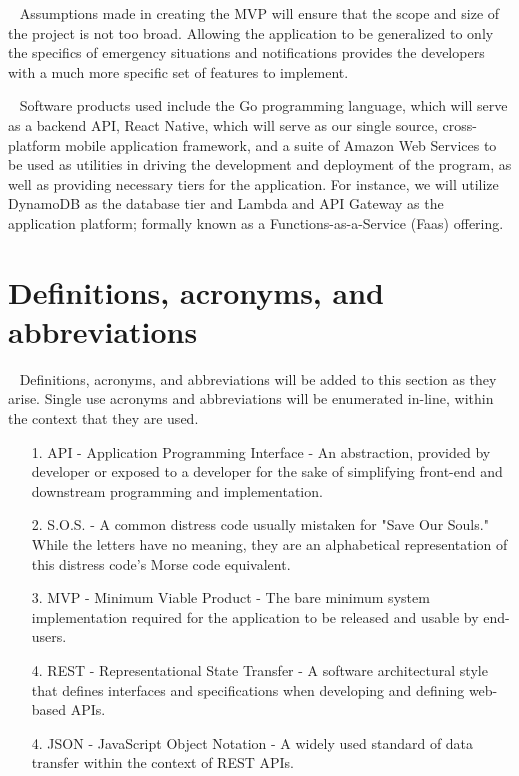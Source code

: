 \documentclass{scrreprt}
\begin{document}
\par ~ Assumptions made in creating the MVP will ensure that the scope and size of the project is not too broad. Allowing the application to be generalized to only the specifics of emergency situations and notifications provides the developers with a much more specific set of features to implement.

\par ~ Software products used include the Go programming language, which will serve as a backend API, React Native, which will serve as our single source, cross-platform mobile application framework, and a suite of Amazon Web Services to be used as utilities in driving the development and deployment of the program, as well as providing necessary tiers for the application. For instance, we will utilize DynamoDB as the database tier and Lambda and API Gateway as the application platform; formally known as a Functions-as-a-Service (Faas) offering.


\section{Definitions, acronyms, and abbreviations}
\par ~ Definitions, acronyms, and abbreviations will be added to this section as they arise. Single use acronyms and abbreviations will be enumerated in-line, within the context that they are used.
\begin{enumerate}
	\item[1.] API - Application Programming Interface - An abstraction, provided by developer or exposed to a developer for the sake of simplifying front-end and downstream programming and implementation.
	\item[2.] S.O.S. - A common distress code usually mistaken for "Save Our Souls." While the letters have no meaning, they are an alphabetical representation of this distress code's Morse code equivalent.
	\item[3.] MVP - Minimum Viable Product - The bare minimum system implementation required for the application to be released and usable by end-users.
	\item[4.] REST - Representational State Transfer - A software architectural style that defines interfaces and specifications when developing and defining web-based APIs.
	\item[4.] JSON - JavaScript Object Notation - A widely used standard of data transfer within the context of REST APIs.
\end{enumerate}
\end{document}
